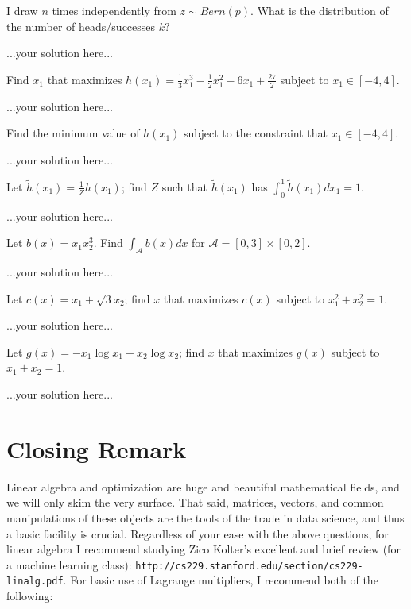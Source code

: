 \documentclass[]{../util/ColumbiaAssm}
\begin{document}
\begin{questions}
\question[2] I draw $n$ times independently from $z \sim Bern(p)$.  What is the distribution of the number of heads/successes $k$?
\begin{solution}
...your solution here...
\end{solution}
  
\question[2] Find $x_1$ that maximizes $h(x_1) = \frac{1}{3}x_1^3 - \frac{1}{2}x_1^2 - 6x_1 + \frac{27}{2}$ subject to $x_1 \in [-4,4]$.
\begin{solution}
...your solution here...
\end{solution}

\question[2] Find the minimum value of $h(x_1)$ subject to the constraint that $x_1 \in [-4,4]$. 
\begin{solution}
...your solution here...
\end{solution}

\question[2] Let $\tilde{h}(x_1) = \frac{1}{Z}h(x_1)$; find $Z$ such that $\tilde{h}(x_1)$ has $\int_{0}^{1} \tilde{h}(x_1)dx_1  = 1$.
\begin{solution}
...your solution here...
\end{solution}

\question[2] Let $b(x) = x_1x_2^3$.  Find $\int_\mathcal{A} b(x) dx$ for $\mathcal{A} = [0,3]\times [0,2]$.
\begin{solution}
...your solution here...
\end{solution}

\question[2] Let $c(x) = x_1 + \sqrt{3}x_2$; find $x$ that maximizes $c(x)$ subject to $x_1^2 + x_2^2 = 1$.
\begin{solution}
...your solution here...
\end{solution}

\question[2] Let $g(x) = -x_1 \log x_1 - x_2 \log x_2$; find $x$ that maximizes $g(x)$ subject to  $x_1+x_2 = 1$.
\begin{solution}
...your solution here...
\end{solution}


\end{questions}

\section*{Closing Remark}

Linear algebra and optimization are huge and beautiful mathematical fields, and we will only skim the very surface.  That said, matrices, vectors, and common manipulations of these objects are the tools of the trade in data science, and thus a basic facility is crucial.  Regardless of your ease with the above questions, for linear algebra I recommend studying Zico Kolter's excellent and brief review (for a machine learning class): {\tt \footnotesize http://cs229.stanford.edu/section/cs229-linalg.pdf}.  For basic use of Lagrange multipliers, I recommend both of the following:
\end{document}
